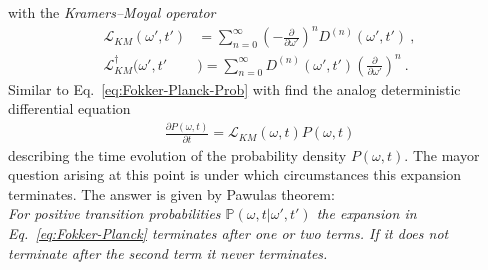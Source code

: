 \documentclass[11pt,a4paper]{article}
\numberwithin{equation}{section}
\begin{document}
with the {\it Kramers--Moyal operator}
\begin{align*}
\mathcal{L}_{KM}(\omega',t')&=\sum_{n=0}^{\infty}\left(- \frac{\partial}{\partial \omega'}\right)^nD^{(n)}(\omega',t')~,\\
\mathcal{L}_{KM}^{\dagger}(\omega',t'&)=\sum_{n=0}^{\infty}D^{(n)}(\omega',t')\left( \frac{\partial}{\partial \omega'}\right)^n~.
\end{align*} 
Similar to Eq.~\eqref{eq:Fokker-Planck-Prob} with find the analog deterministic differential equation
\begin{align}
\label{eq:Fokker-Planck}
\frac{\partial P(\omega,t)}{\partial t}
=
\mathcal{L}_{KM}(\omega,t)P(\omega,t)
\end{align}
describing the time evolution of the probability density $P(\omega,t)$.
%
The mayor question arising at this point is under which circumstances this expansion terminates.
%
The answer is given by Pawulas theorem\cite{risken1989fokker}:\\

\textit{
For positive transition probabilities $\mathbb{P}(\omega, t| \omega', t')$ the expansion in Eq.~\eqref{eq:Fokker-Planck} terminates after one or two terms. If it does not terminate after the second term it never terminates.\\
}
\end{document}
